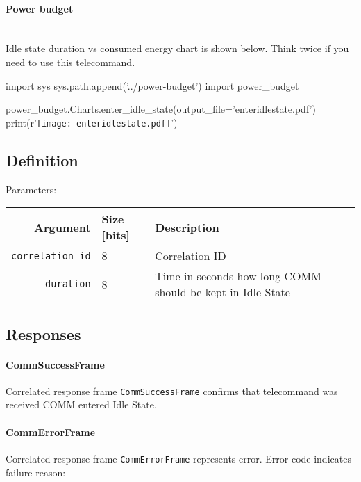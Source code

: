 \paragraph{Power budget} \mbox{} \\
Idle state duration vs consumed energy chart is shown below. Think twice if you need to use this telecommand.

\begin{center}
\begin{pycode}
import sys
sys.path.append('../power-budget')
import power_budget

power_budget.Charts.enter_idle_state(output_file='enteridlestate.pdf')
print(r'\texttt{[image: enteridlestate.pdf]}')
\end{pycode}
\end{center}

\subsection{Definition}

Parameters: 

\begin{tabular}{r | l | l}
	Argument                    & Size [bits] & Description \\
	\hline
	\texttt{correlation\_id}    & 8 		  &	Correlation ID \\
	\texttt{duration}			& 8 		  & Time in seconds how long COMM should be kept in Idle State
\end{tabular}

\subsection{Responses}

\paragraph{CommSuccessFrame}
Correlated response frame \texttt{CommSuccessFrame} confirms that telecommand was received COMM entered Idle State.

\paragraph{CommErrorFrame}
Correlated response frame \texttt{CommErrorFrame} represents error. Error code indicates failure reason:

